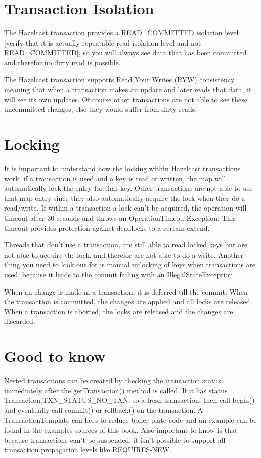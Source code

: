 \section{Transaction Isolation}
The Hazelcast transaction provides a READ\_COMMITTED isolation level [verify that it is actually repeatable read isolation level and not READ\_COMMITTED], so you will always see data that has been committed and therefor no dirty read is possible. 

The Hazelcast transaction supports Read Your Writes (RYW) consistency, meaning that when a transaction makes an update and later reads that data, it will see its own updates. Of course other transactions are not able to see these uncommitted changes, else they would suffer from dirty reads.

\section{Locking}
It is important to understand how the locking within Hazelcast transactions work; if a transaction is used and a key is read or written, the map will automatically lock the entry for that key. Other transactions are not able to use that map entry since they also automatically acquire the lock when they do a read/write. If within a transaction a lock can't be acquired, the operation will timeout after 30 seconds and throws an OperationTimeoutException. This timeout provides protection against deadlocks to a certain extend.

Threads that don't use a transaction, are still able to read locked keys but are not able to acquire the lock, and therefor are not able to do a write. Another thing you need to look out for is manual unlocking of keys when transactions are used, because it leads to the commit failing with an IllegalStateException. 

When an change is made in a transaction, it is deferred till the commit. When the transaction is committed, the changes are applied and all locks are released. When a transaction is aborted, the locks are released and the changes are discarded.

\section{Good to know}

Nested transactions can be created by checking the transaction status immediately after the getTransaction() method is called. If it has status Transaction.TXN\_STATUS\_NO\_TXN, so a fresh transaction, then call begin() and eventually call commit() or rollback() on the transaction. A TransactionTemplate can help to reduce boiler plate code and an example can be found in the examples sources of this book. Also important to know is that because transactions can't be suspended, it isn't possible to support all transaction propagation levels like REQUIRES-NEW. 

